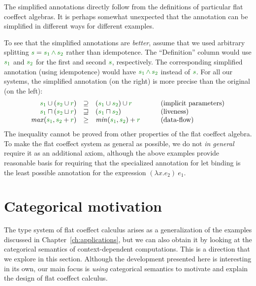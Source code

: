 \noindent
The simplified annotations directly follow from the definitions of particular flat coeffect 
algebras. It is perhaps somewhat unexpected that the annotation can be simplified in different
ways for different examples. 

To see that the simplified annotations are \emph{better}, assume that we used arbitrary 
splitting $\cclrd{s} = \cclrd{s_1}\,\czip\,\cclrd{s_2}$ rather than idempotence. The
``Definition'' column would use $\cclrd{s_1}$ and $\cclrd{s_2}$ for the first and second 
$\cclrd{s}$, respectively. The corresponding simplified annotation (using idempotence) would
have $\cclrd{s_1}\,\czip\,\cclrd{s_2}$ instead of $\cclrd{s}$. For all our systems, the 
simplified annotation (on the right) is more precise than the original (on the left):
%
\begin{equation*}
\begin{array}{rclll}
\cclrd{s_1} \cup (\cclrd{s_2} \cup \cclrd{r}) &\supseteq& (\cclrd{s_1} \cup \cclrd{s_2}) \cup \cclrd{r} 
  && \textnormal{(implicit parameters)}\\
\cclrd{s_1} \sqcap (\cclrd{s_2} \sqcup \cclrd{r}) &\sqsupseteq&  (\cclrd{s_1} \sqcap \cclrd{s_2}) 
  && \textnormal{(liveness)} \\
\mathit{max}(\cclrd{s_1}, \cclrd{s_2} + \cclrd{r}) &\geq& \mathit{min}(\cclrd{s_1}, \cclrd{s_2}) + \cclrd{r} 
  &\quad& \textnormal{(data-flow)} \\
\end{array}
\end{equation*}
%
The inequality cannot be proved from other properties of the flat coeffect algebra. To make
the flat coeffect system as general as possible, we do not \emph{in general} require it as
an additional axiom, although the above examples provide reasonable basis for requiring 
that the specialized annotation for let binding is the least possible annotation for the 
expression $(\lambda x.e_2)~e_1$.


\section{Categorical motivation}
\label{sec:flat-semantics}

The type system of flat coeffect calculus arises as a generalization of the examples discussed in 
Chapter~\ref{ch:applications}, but we can also obtain it by looking at the categorical semantics
of context-dependent computations. This is a direction that we explore in this section. Although
the development presented here is interesting in its own, our main focus is \emph{using} categorical
semantics to motivate and explain the design of flat coeffect calculus.

